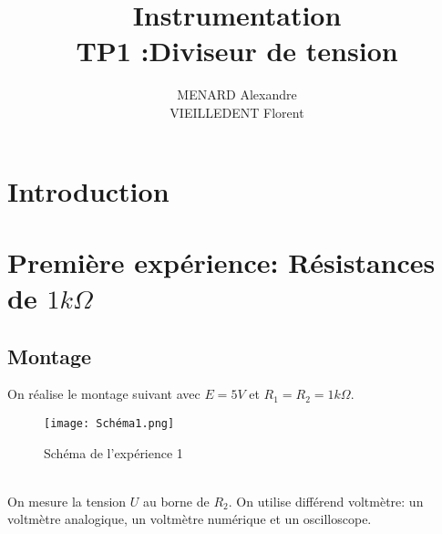 \documentclass[12pt]{article}
\title{\textbf{Instrumentation} \\ TP1 :Diviseur de tension}
\author{MENARD Alexandre \\ VIEILLEDENT Florent}
\begin{document}
\maketitle

\section*{Introduction}
\section{Première expérience: Résistances de $1k\Omega$ }
\subsection{Montage}
On réalise le montage suivant avec $E=5V$ et $R_{1}=R_{2}=1k\Omega$.
\begin{figure}[!htbp]
\begin{center}


\texttt{[image: Schéma1.png]}
\label{Schéma1}
\caption{Schéma de l'expérience 1}
\end{center}
\end{figure}\\
On mesure la tension $U$ au borne de $R_{2}$. On utilise différend voltmètre: un voltmètre analogique, un voltmètre numérique et un oscilloscope. 
\end{document}
